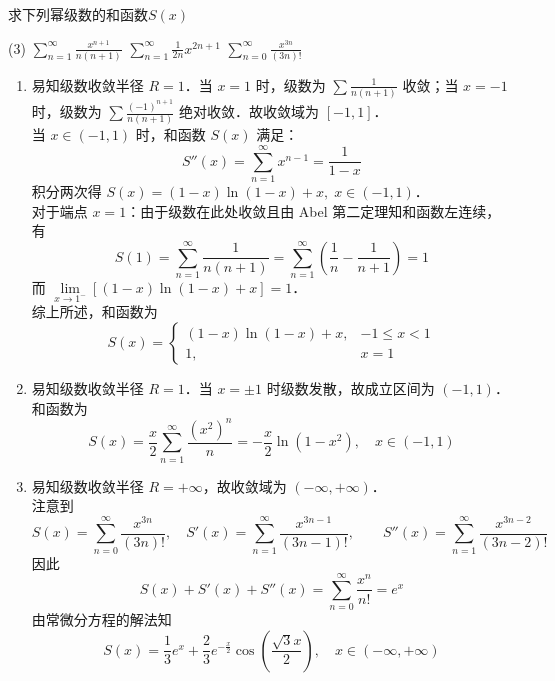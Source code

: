 \documentclass[12pt, a4paper, oneside, UTF8]{ctexbook}
\begin{document}
\begin{example}
    求下列幂级数的和函数$S(x)$
    \begin{tasks}[label=(\arabic*)](3)
        \task $\displaystyle\sum_{n=1}^{\infty}\frac{x^{n+1}}{n(n+1)}$
        \task $\displaystyle\sum_{n=1}^{\infty}\frac{1}{2n}x^{2n+1}$
        \task $\displaystyle\sum_{n=0}^{\infty}\frac{x^{3n}}{(3n)!}$
    \end{tasks}
\end{example}
\begin{solution}
    \begin{enumerate}[label=(\arabic*)]
        \item 易知级数收敛半径 $R=1$．当 $x=1$ 时，级数为 $\sum \frac{1}{n(n+1)}$ 收敛；当 $x=-1$ 时，级数为 $\sum \frac{(-1)^{n+1}}{n(n+1)}$ 绝对收敛．故收敛域为 $[-1, 1]$．\\
        当 $x \in (-1, 1)$ 时，和函数 $S(x)$ 满足：
        \[S''(x) = \sum_{n=1}^\infty x^{n-1} = \frac{1}{1-x}\]
        积分两次得 $S(x) = (1-x)\ln(1-x) + x, \; x \in (-1, 1)$．\\
        对于端点 $x=1$：由于级数在此处收敛且由 Abel 第二定理知和函数左连续，有
        \[S(1) = \sum_{n=1}^\infty \frac{1}{n(n+1)} = \sum_{n=1}^\infty \left(\frac{1}{n}-\frac{1}{n+1}\right) = 1\]
        而 $\lim\limits_{x \to 1^-} [(1-x)\ln(1-x) + x] = 1$．\\
        综上所述，和函数为
        \[ \boxed{S(x) = \begin{cases} (1-x)\ln(1-x) + x, & -1 \le x < 1 \\ 1, & x = 1 \end{cases}} \]
        \item 易知级数收敛半径 $R=1$．当 $x=\pm 1$ 时级数发散，故成立区间为 $(-1, 1)$．\\
        和函数为
        \[ \boxed{S(x)=\frac{x}{2}\sum_{n=1}^{\infty}\frac{(x^2)^n}{n}=-\frac{x}{2}\ln(1-x^2), \quad x \in (-1, 1)} \]
        \item 易知级数收敛半径 $R=+\infty$，故收敛域为 $(-\infty, +\infty)$．\\
        注意到
        \[S(x) = \sum_{n=0}^\infty \frac{x^{3n}}{(3n)!}, \quad S'(x) = \sum_{n=1}^\infty \frac{x^{3n-1}}{(3n-1)!}, \qquad S''(x) = \sum_{n=1}^\infty \frac{x^{3n-2}}{(3n-2)!} \]
        因此
        \[S(x) + S'(x) + S''(x) = \sum_{n=0}^\infty \frac{x^n}{n!} = e^x\]
        由常微分方程的解法知
        \[ \boxed{S(x) = \dfrac{1}{3} e^x + \dfrac{2}{3} e^{-\frac{x}{2}} \cos\left(\frac{\sqrt{3}x}{2}\right), \quad x \in (-\infty, +\infty) } \]
    \end{enumerate}
\end{solution}
\end{document}
